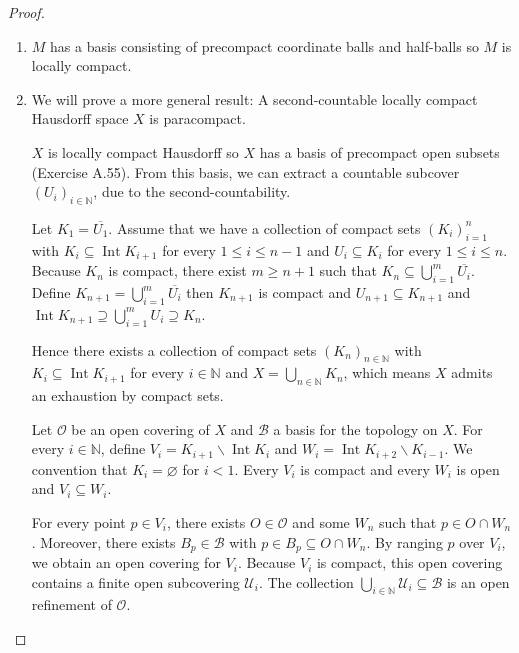 \begin{proof}
\begin{enumerate}[itemsep=0pt,label={(\alph*)}]
              \( M \) is second-countable so it is covered by countably many coordinate domains. Let the collection of the corresponding coordinate charts be \( {\left\{ (U_{n}, \varphi_{n}) \right\}}_{n \in \mathbb{N}} \). From the previous paragraphs in this proof, \( U_{n} \) has a countable basis consisting of precompact coordinate balls and half-balls. Therefore \( M \) has a countable basis consisting of precompact coordinate balls and half-balls.
        \item \( M \) has a basis consisting of precompact coordinate balls and half-balls so \( M \) is locally compact.
        \item We will prove a more general result: A second-countable locally compact Hausdorff space \( X \) is paracompact.

              \( X \) is locally compact Hausdorff so \( X \) has a basis of precompact open subsets (Exercise A.55). From this basis, we can extract a countable subcover \( {(U_{i})}_{i \in \mathbb{N}} \), due to the second-countability.

              Let \( K_{1} = \overline{U_{1}} \). Assume that we have a collection of compact sets \( {(K_{i})}_{i=1}^{n} \) with \( K_{i} \subseteq \operatorname{Int} K_{i+1} \) for every \( 1 \le i \le n - 1 \) and \( U_{i} \subseteq K_{i} \) for every \( 1 \le i \le n \). Because \( K_{n} \) is compact, there exist \( m \ge n + 1 \) such that \( K_{n} \subseteq \bigcup_{i=1}^{m} \overline{U_{i}} \). Define \( K_{n+1} = \bigcup_{i=1}^{m} \overline{U_{i}} \) then \( K_{n+1} \) is compact and \( U_{n+1} \subseteq K_{n+1} \) and \( \operatorname{Int} K_{n+1} \supseteq \bigcup_{i=1}^{m} U_{i} \supseteq K_{n} \).

              Hence there exists a collection of compact sets \( {(K_{n})}_{n \in \mathbb{N}} \) with \( K_{i} \subseteq \operatorname{Int} K_{i+1} \) for every \( i \in \mathbb{N} \) and \( X = \bigcup_{n \in \mathbb{N}} K_{n} \), which means \( X \) admits an exhaustion by compact sets.

              Let \( \mathcal{O} \) be an open covering of \( X \) and \( \mathcal{B} \) a basis for the topology on \( X \). For every \( i \in \mathbb{N} \), define \( V_{i} = K_{i+1} \smallsetminus \operatorname{Int} K_{i} \) and \( W_{i} = \operatorname{Int} K_{i+2} \smallsetminus K_{i-1} \). We convention that \( K_{i} = \varnothing \) for \( i < 1 \). Every \( V_{i} \) is compact and every \( W_{i} \) is open and \( V_{i} \subseteq W_{i} \).

              For every point \( p \in V_{i} \), there exists \( O \in \mathcal{O} \) and some \( W_{n} \) such that \( p \in O \cap W_{n} \). Moreover, there exists \( B_{p} \in \mathcal{B} \) with \( p \in B_{p} \subseteq O \cap W_{n} \). By ranging \( p \) over \( V_{i} \), we obtain an open covering for \( V_{i} \). Because \( V_{i} \) is compact, this open covering contains a finite open subcovering \( \mathcal{U}_{i} \). The collection \( \bigcup_{i \in \mathbb{N}} \mathcal{U}_{i} \subseteq \mathcal{B} \) is an open refinement of \( \mathcal{O} \).


\end{enumerate}
\end{proof}

